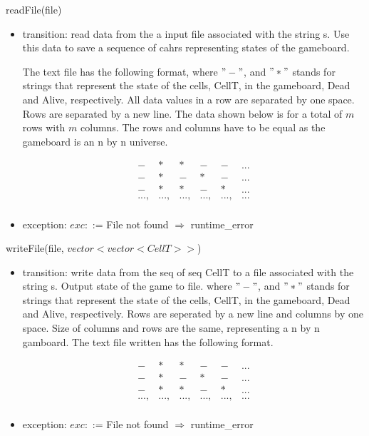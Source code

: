 \documentclass[12pt]{article}
\begin{document}
\noindent readFile(file)
\begin{itemize}
\item transition: read data from the a input file associated with the string s.
  Use this data to save a sequence of cahrs representing states of the gameboard.

  The text file has the following format, where $"-"$, and $"*"$ stands for strings that
  represent the state of the cells, CellT, in the gameboard, Dead and Alive, respectively.
  All data values in a row are separated by one space. Rows are
  separated by a new line.  The data shown below is for a total of $m$ rows with $m$ columns.
  The rows and columns have to be equal as the gameboard is an n by n universe.

  \begin{equation}
    \begin{array}{ccccccc}
      - & * & * & - & - & ... \\
      - & * & - & * & - & ... \\
      - & * & * & - & * & ...
      \\
      ..., & ..., & ..., & ..., & ..., & ...
      \\
    \end{array}
  \end{equation}

\item exception: $exc:$ := File not found $\Rightarrow$ runtime\_error\\
\end{itemize}

\noindent writeFile(file, $vector<vector<CellT>>$) 
\begin{itemize}
\item transition: write data from the seq of seq CellT to a file associated with the string s.
  Output state of the game to file. where $"-"$, and $"*"$ stands for strings that
  represent the state of the cells, CellT, in the gameboard, Dead and Alive, respectively. Rows are 
  seperated by a new line and columns by one space. Size of columns and rows are the same, representing a 
  n by n gamboard.
  The text file written has the following format. 

  \begin{equation}
    \begin{array}{ccccccc}
      - & * & * & - & - & ... \\
      - & * & - & * & - & ... \\
      - & * & * & - & * & ...
      \\
      ..., & ..., & ..., & ..., & ..., & ...
      \\
    \end{array}
  \end{equation}

\item exception: $exc:$ := File not found $\Rightarrow$ runtime\_error\\
\end{itemize}
\end{document}
